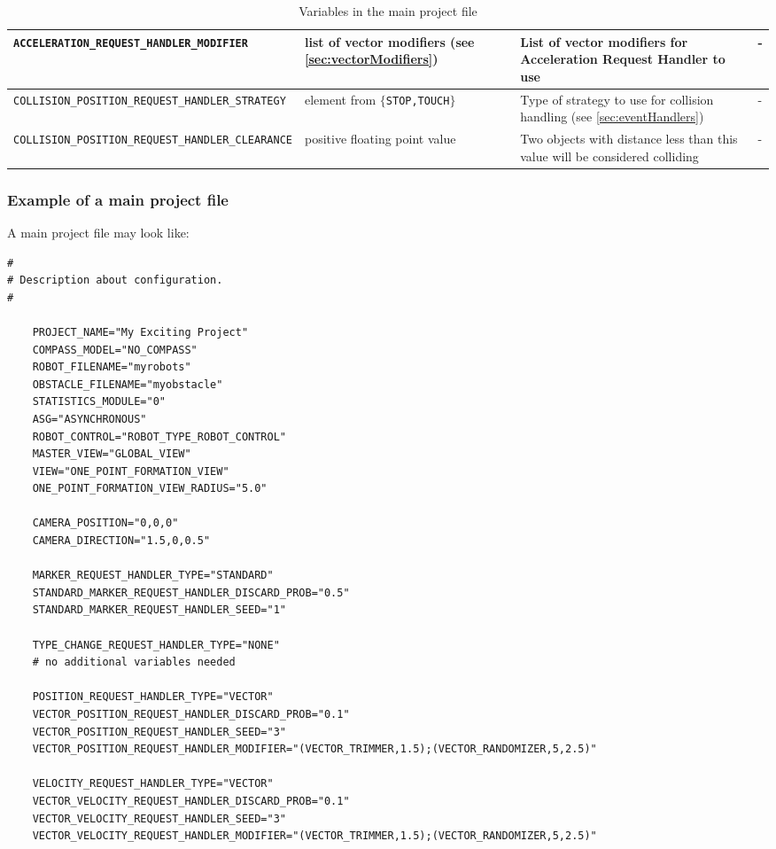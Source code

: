 \begin{sidewaystable}
\begin{tabular}{|l|p{}|p{}|p{}|}
		\texttt{ACCELERATION\_REQUEST\_HANDLER\_MODIFIER} & list of vector modifiers (see \ref{sec:vectorModifiers}) & List of vector modifiers for Acceleration Request Handler to use & -\\\hline
		
		\texttt{COLLISION\_POSITION\_REQUEST\_HANDLER\_STRATEGY} & element from $\{$\texttt{STOP,TOUCH}$\}$ & Type of strategy to use for collision handling (see \ref{sec:eventHandlers}) & -\\\hline
		
		\texttt{COLLISION\_POSITION\_REQUEST\_HANDLER\_CLEARANCE} & positive floating point value & Two objects with distance less than this value will be considered colliding & -\\\hline
				
	\end{tabular}
	\caption{Variables in the main project file}\label{tab:mainvars2}
\end{sidewaystable}
\enlargethispage*{2cm}
\thispagestyle{empty}
\clearpage


\subsubsection{Example of a main project file}
A main project file may look like:
\lstset{language=tcl}
\begin{lstlisting}
# 
# Description about configuration.
#
	
	PROJECT_NAME="My Exciting Project"
	COMPASS_MODEL="NO_COMPASS"
	ROBOT_FILENAME="myrobots"
	OBSTACLE_FILENAME="myobstacle"
	STATISTICS_MODULE="0"
	ASG="ASYNCHRONOUS"
	ROBOT_CONTROL="ROBOT_TYPE_ROBOT_CONTROL"
	MASTER_VIEW="GLOBAL_VIEW"
	VIEW="ONE_POINT_FORMATION_VIEW"
	ONE_POINT_FORMATION_VIEW_RADIUS="5.0"
	
	CAMERA_POSITION="0,0,0"
	CAMERA_DIRECTION="1.5,0,0.5"
	
	MARKER_REQUEST_HANDLER_TYPE="STANDARD"
	STANDARD_MARKER_REQUEST_HANDLER_DISCARD_PROB="0.5"
	STANDARD_MARKER_REQUEST_HANDLER_SEED="1"

	TYPE_CHANGE_REQUEST_HANDLER_TYPE="NONE"
	# no additional variables needed

	POSITION_REQUEST_HANDLER_TYPE="VECTOR"
	VECTOR_POSITION_REQUEST_HANDLER_DISCARD_PROB="0.1"
	VECTOR_POSITION_REQUEST_HANDLER_SEED="3"
	VECTOR_POSITION_REQUEST_HANDLER_MODIFIER="(VECTOR_TRIMMER,1.5);(VECTOR_RANDOMIZER,5,2.5)"

	VELOCITY_REQUEST_HANDLER_TYPE="VECTOR"
	VECTOR_VELOCITY_REQUEST_HANDLER_DISCARD_PROB="0.1"
	VECTOR_VELOCITY_REQUEST_HANDLER_SEED="3"
	VECTOR_VELOCITY_REQUEST_HANDLER_MODIFIER="(VECTOR_TRIMMER,1.5);(VECTOR_RANDOMIZER,5,2.5)"
\end{lstlisting}


